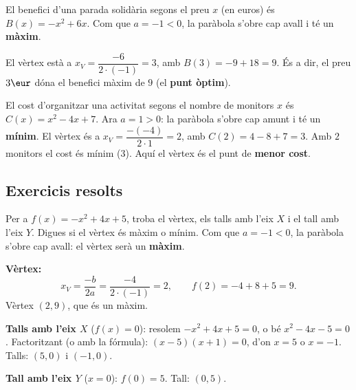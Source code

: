 \begin{exemple}
El benefici d'una parada solidària segons el preu $x$ (en euros) és
$B(x)=-x^2+6x$. Com que $a=-1<0$, la paràbola s'obre cap avall i té un \textbf{màxim}.

\begin{center}

\end{center}

\noindent El vèrtex està a $x_V=\dfrac{-6}{2\cdot(-1)}=3$, amb $B(3)=-9+18=9$. És a dir,
el preu $3\eur$ dóna el benefici màxim de $9$ (el \textbf{punt òptim}).
\end{exemple}

\begin{exemple}
El cost d'organitzar una activitat segons el nombre de monitors $x$ és
$C(x)=x^2-4x+7$. Ara $a=1>0$: la paràbola s'obre cap amunt i té un \textbf{mínim}.
El vèrtex és a $x_V=\dfrac{-(-4)}{2\cdot 1}=2$, amb $C(2)=4-8+7=3$. Amb $2$ monitors
el cost és mínim ($3$). Aquí el vèrtex és el punt de \textbf{menor cost}.
\end{exemple}

\subsection{Exercicis resolts}

\begin{exresolt}
Per a $f(x)=-x^2+4x+5$, troba el vèrtex, els talls amb l'eix $X$ i el tall amb
l'eix $Y$. Digues si el vèrtex és màxim o mínim.
\solucio
Com que $a=-1<0$, la paràbola s'obre cap avall: el vèrtex serà un \textbf{màxim}.

\textbf{Vèrtex:}
\[
x_V=\frac{-b}{2a}=\frac{-4}{2\cdot(-1)}=2,\qquad
f(2)=-4+8+5=9.
\]
Vèrtex $(2,9)$, que és un màxim.

\textbf{Talls amb l'eix $X$} ($f(x)=0$): resolem $-x^2+4x+5=0$, o bé
$x^2-4x-5=0$. Factoritzant (o amb la fórmula): $(x-5)(x+1)=0$, d'on $x=5$ o $x=-1$.
Talls: $(5,0)$ i $(-1,0)$.

\textbf{Tall amb l'eix $Y$} ($x=0$): $f(0)=5$. Tall: $(0,5)$.
\end{exresolt}

